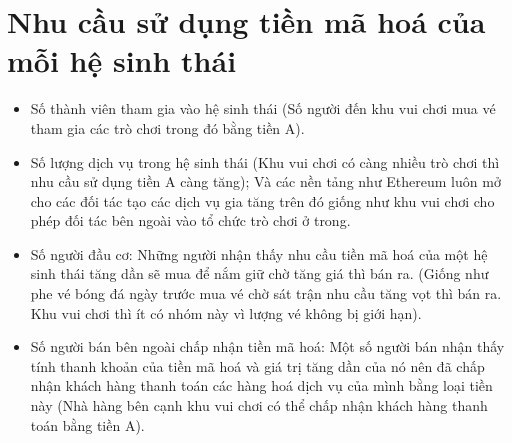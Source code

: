 \section{Nhu cầu sử dụng tiền mã hoá của mỗi hệ sinh thái}
\begin{itemize}
    \item Số thành viên tham gia vào hệ sinh thái (Số người đến khu vui chơi mua vé tham gia các trò chơi trong đó bằng tiền A).
    \item Số lượng dịch vụ trong hệ sinh thái (Khu vui chơi có càng nhiều trò chơi thì nhu cầu sử dụng tiền A càng tăng); Và các nền tảng như Ethereum luôn mở cho các đối tác tạo các dịch vụ gia tăng trên đó giống như khu vui chơi cho phép đối tác bên ngoài vào tổ chức trò chơi ở trong.
    \item  Số người đầu cơ: Những người nhận thấy nhu cầu tiền mã hoá của một hệ sinh thái tăng dần sẽ mua để nắm giữ chờ tăng giá thì bán ra. (Giống như phe vé bóng đá ngày trước mua vé chờ sát trận nhu cầu tăng vọt thì bán ra. Khu vui chơi thì ít có nhóm này vì lượng vé không bị giới hạn).
    \item  Số người bán bên ngoài chấp nhận tiền mã hoá: Một số người bán nhận thấy tính thanh khoản của tiền mã hoá và giá trị tăng dần của nó nên đã chấp nhận khách hàng thanh toán các hàng hoá dịch vụ của mình bằng loại tiền này (Nhà hàng bên cạnh khu vui chơi có thể chấp nhận khách hàng thanh toán bằng tiền A).
\end{itemize}
